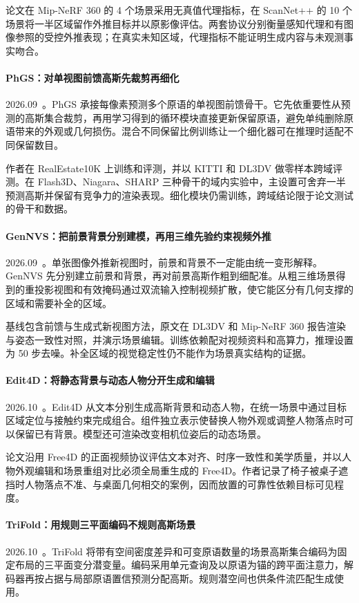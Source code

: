 论文在 Mip-NeRF 360 的 4 个场景采用无真值代理指标，在 ScanNet++ 的 10 个场景将一半区域留作外推目标并以原影像评估。两套协议分别衡量感知代理和有图像参照的受控外推表现；在真实未知区域，代理指标不能证明生成内容与未观测事实吻合。

\paragraph{PhGS：对单视图前馈高斯先裁剪再细化}
2026.09~\cite{2609_20623}。PhGS 承接每像素预测多个原语的单视图前馈骨干。它先依重要性从预测的高斯集合裁剪，再用学习得到的循环模块直接更新保留原语，避免单纯删除原语带来的外观或几何损伤。混合不同保留比例训练让一个细化器可在推理时适配不同保留数目。

作者在 RealEstate10K 上训练和评测，并以 KITTI 和 DL3DV 做零样本跨域评测。在 Flash3D、Niagara、SHARP 三种骨干的域内实验中，主设置可舍弃一半预测高斯并保留有竞争力的渲染表现。细化模块仍需训练，跨域结论限于论文测试的骨干和数据。

\paragraph{GenNVS：把前景背景分别建模，再用三维先验约束视频外推}
2026.09~\cite{2609_34579}。单张图像外推新视图时，前景和背景不一定能由统一变形解释。GenNVS 先分别建立前景和背景，再对前景高斯作粗到细配准。从粗三维场景得到的重投影视图和有效掩码通过双流输入控制视频扩散，使它能区分有几何支撑的区域和需要补全的区域。

基线包含前馈与生成式新视图方法，原文在 DL3DV 和 Mip-NeRF 360 报告渲染与姿态一致性对照，并演示场景编辑。训练依赖配对视频资料和高算力，推理设置为 50 步去噪。补全区域的视觉稳定性仍不能作为场景真实结构的证据。

\paragraph{Edit4D：将静态背景与动态人物分开生成和编辑}
2026.10~\cite{2610_21668}。Edit4D 从文本分别生成高斯背景和动态人物，在统一场景中通过目标区域定位与接触约束完成组合。组件独立表示使替换人物外观或调整人物落点时可以保留已有背景。模型还可渲染改变相机位姿后的动态场景。

论文沿用 Free4D 的正面视频协议评估文本对齐、时序一致性和美学质量，并以人物外观编辑和场景重组对比必须全局重生成的 Free4D。作者记录了椅子被桌子遮挡时人物落点不准、与桌面几何相交的案例，因而放置的可靠性依赖目标可见程度。

\paragraph{TriFold：用规则三平面编码不规则高斯场景}
2026.10~\cite{2610_23050}。TriFold 将带有空间密度差异和可变原语数量的场景高斯集合编码为固定布局的三平面变分潜变量。编码采用单元查询及以原语为锚的跨平面注意力，解码器再按占据与局部原语置信预测分配高斯。规则潜空间也供条件流匹配生成使用。

